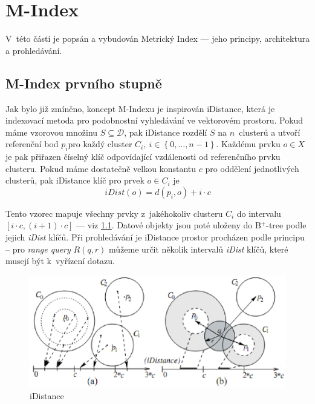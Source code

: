 \chapter{M-Index}

V~této části je popsán a vybudován Metrický Index --- jeho principy,
architektura a prohledávání\@.


\section{M-Index prvního stupně}

Jak bylo již zmíněno, koncept M-Indexu je inspirován iDistance, která
je indexovací metoda pro podobnostní vyhledávání ve vektorovém prostoru\@.
Pokud máme vzorovou množinu $S\subseteq\mathbb{\mathcal{D}}$, pak
iDistance rozdělí $S$ na $n$~clusterů a utvoří referenční bod $p_{i}$pro
každý cluster $C_{i},\: i\in\left\{ 0,\ldots,n-1\right\} $. Každému
prvku $o\in X$ je pak přiřazen číselný klíč odpovídající vzdálenosti
od referenčního prvku clusteru. Pokud máme dostatečně velkou konstantu
$c$ pro oddělení jednotlivých clusterů, pak iDistance klíč pro prvek
$o\in C_{i}$ je
\[
iDist(o)=d(p_{i},o)+i\cdot c
\]


Tento vzorec mapuje všechny prvky z~jakéhokoliv clusteru $C_{i}$
do intervalu $[i\cdot c,(i+1)\cdot c]$ --- viz \ref{fig:iDistance}\@.
Datové objekty jsou poté uloženy do B$^{+}$-tree podle jejich \emph{iDist
}klíčů. Při prohledávání je iDistance prostor procházen podle principu
-- pro \emph{range query} $R(q,r)$ můžeme určit několik intervalů
\emph{iDist} klíčů, které musejí být k~vyřízení dotazu\@.

\begin{figure}[t]
\begin{centering}
\includegraphics[clip,scale=0.4]{idistance}
\par\end{centering}

\caption{iDistance\label{fig:iDistance}}
\end{figure}


